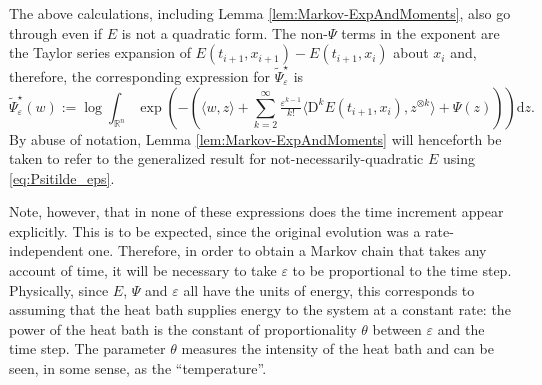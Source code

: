 \documentclass[reqno]{amsart}
\theoremstyle{definition}
\begin{document}
The above calculations, including Lemma \ref{lem:Markov-ExpAndMoments}, also go through even if $E$ is not a quadratic form.  The non-$\Psi$ terms in the exponent are the Taylor series expansion of $E(t_{i + 1}, x_{i + 1}) - E(t_{i + 1}, x_{i})$ about $x_{i}$ and, therefore, the corresponding expression for ${\widetilde{\Psi}}_{\varepsilon}^{\star}$ is
\begin{equation}
	\label{eq:Psitilde_eps}
	{\widetilde{\Psi}}_{\varepsilon}^{\star} (w) := \log \int_{{\mathbb{R}}^{n}} \exp \left( - \left( \langle w, z \rangle + \sum_{k = 2}^{\infty} \tfrac{{\varepsilon}^{k - 1}}{k !} \langle {\mathrm{D}}^{k} E(t_{i + 1}, x_{i}), z^{\otimes k} \rangle + \Psi(z) \right) \right) {\mathrm{d}} z.
\end{equation}
By abuse of notation, Lemma \ref{lem:Markov-ExpAndMoments} will henceforth be taken to refer to the generalized result for not-necessarily-quadratic $E$ using \eqref{eq:Psitilde_eps}.

Note, however, that in none of these expressions does the time increment appear explicitly.  This is to be expected, since the original evolution was a rate-independent one.  Therefore, in order to obtain a Markov chain that takes any account of time, it will be necessary to take ${\varepsilon}$ to be proportional to the time step.  Physically, since $E$, $\Psi$ and ${\varepsilon}$ all have the units of energy, this corresponds to assuming that the heat bath supplies energy to the system at a constant rate:  the power of the heat bath is the constant of proportionality $\theta$ between ${\varepsilon}$ and the time step.  The parameter $\theta$ measures the intensity of the heat bath and can be seen, in some sense, as the ``temperature''.
\end{document}
